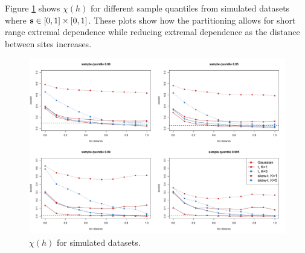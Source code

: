 \documentclass[11pt]{article}
\begin{document}
Figure \ref{fig:simchi} shows $\chi(h)$ for different sample quantiles from simulated datasets where $\mbox{\bf s} \in [0, 1] \times [0, 1]$.
These plots show how the partitioning allows for short range extremal dependence while reducing extremal dependence as the distance between sites increases.
\begin{figure}
  \includegraphics[width=\linewidth]{plots/sim-chi.pdf}
  \caption{$\chi(h)$ for simulated datasets.}
  \label{fig:simchi}
\end{figure}
\end{document}

